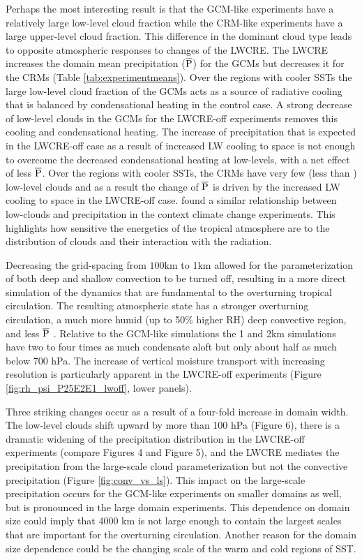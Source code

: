 \documentclass[draft]{agujournal2019}
\begin{document}
{Perhaps the most interesting result is that the GCM-like experiments have a relatively large low-level 
cloud fraction while the CRM-like experiments have a large upper-level cloud fraction.  
This difference in the dominant cloud type leads to opposite atmospheric responses to changes of the LWCRE.  
The LWCRE increases the domain mean precipitation ($\overline{\rm{P}}$) for the GCMs but 
decreases it for the CRMs (Table \ref{tab:experimentmeans}).  
Over the regions with cooler SSTs the large low-level cloud fraction of the GCMs 
acts as a source of radiative cooling that is balanced by condensational heating in the control case.  
A strong decrease of low-level clouds in the GCMs
for the LWCRE-off experiments removes this cooling and condensational heating.  The increase 
of precipitation that is expected in the LWCRE-off case as a result of increased LW cooling to space is not enough
to overcome the decreased condensational heating at low-levels, with a net effect of less $\overline{\rm{P}}$.  
Over the regions with cooler SSTs, the CRMs have very few (less than ) low-level clouds and as a result the 
change of $\overline{\rm{P}}$ is driven by the increased LW cooling to space in the LWCRE-off case.
 found a similar relationship between low-clouds and precipitation in the context  climate 
change experiments.
This highlights how sensitive the energetics of the tropical atmosphere are to the distribution of clouds and 
their interaction with the radiation.      

Decreasing the grid-spacing from $100 \textrm{km}$ to 1km allowed for the parameterization of both deep and shallow 
convection to be turned off, resulting in a more direct simulation of the dynamics that are
fundamental to the overturning tropical circulation.  The resulting atmospheric state has a stronger overturning 
circulation, a much more humid (up to 50\% higher RH) deep convective region, and less $\overline{\rm{P}}$ .  
Relative to the GCM-like simulations the 1 and 2km simulations have two to four times as much condensate
aloft but only about half as much below 700 hPa.  The increase of vertical moisture transport with increasing 
resolution is particularly apparent in the LWCRE-off experiments (Figure \ref{fig:rh_psi_P25E2E1_lwoff}, lower panels).   

Three striking changes occur as a result of a four-fold increase in domain width.  The low-level clouds shift 
upward by more than 100 hPa (Figure 6), there is a dramatic widening of the precipitation distribution in the LWCRE-off experiments 
(compare Figures 4 and Figure 5),  
and the LWCRE mediates the precipitation from the large-scale cloud parameterization but not the convective precipitation (Figure \ref{fig:conv_vs_ls}).    
This impact on the large-scale precipitation occurs for the GCM-like experiments on smaller domains as well, 
but is pronounced in the large domain experiments.  
This dependence on domain size could imply that 4000 km is not large enough to contain the largest 
scales that are important for the overturning circulation.  Another reason for the domain 
size dependence could be the changing scale of the warm and cold regions of SST.  

}
\end{document}

